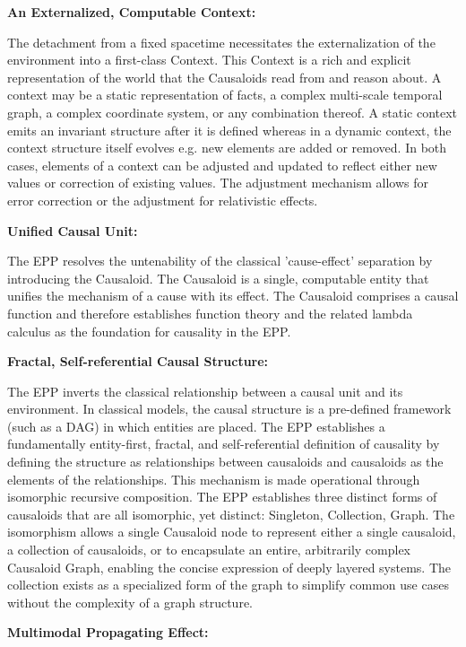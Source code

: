 \textbf{An Externalized, Computable Context:} 

The detachment from a fixed spacetime necessitates the externalization of the environment into a first-class Context. This Context is a rich and explicit representation of the world that the Causaloids read from and reason about. A context may be a static representation of facts, a complex multi-scale temporal graph, a complex coordinate system, or any combination thereof. A static context emits an invariant structure after it is defined whereas in a dynamic context, the context structure itself evolves e.g. new elements are added or removed. In both cases, elements of a context can be adjusted and updated to reflect either new values or correction of existing values. The adjustment mechanism allows for error correction or the adjustment for relativistic effects.   

 \textbf{Unified Causal Unit:} 
 
 The EPP resolves the untenability of the classical 'cause-effect' separation by introducing the Causaloid. The Causaloid is a single, computable entity that unifies the mechanism of a cause with its effect. The Causaloid comprises a causal function and therefore establishes function theory and the related lambda calculus as the foundation for causality in the EPP. 

 \newpage

\textbf{Fractal, Self-referential Causal Structure:} 

The EPP inverts the classical relationship between a causal unit and its environment. In classical models, the causal structure is a pre-defined framework (such as a DAG) in which entities are placed. The EPP establishes a fundamentally entity-first, fractal, and self-referential definition of causality by defining the structure as relationships between causaloids and causaloids as the elements of the relationships. This mechanism is made operational through isomorphic recursive composition. The EPP establishes three distinct forms of causaloids that are all isomorphic, yet distinct: Singleton, Collection, Graph.  The isomorphism allows a single Causaloid node to represent either a single causaloid, a collection of causaloids, or to encapsulate an entire, arbitrarily complex Causaloid Graph, enabling the concise expression of deeply layered systems. The collection exists as a specialized form of the graph to simplify common use cases without the complexity of a graph structure. 


\textbf{Multimodal Propagating Effect:}
  
